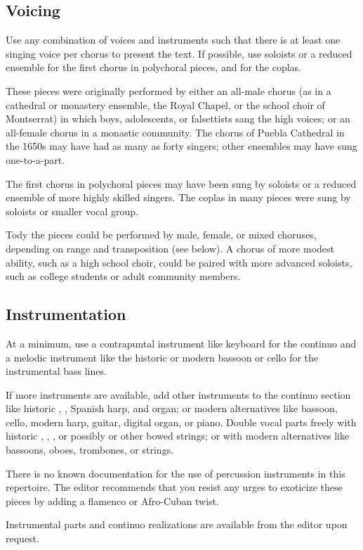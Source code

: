 \subsection*{Voicing}

\begin{epitome}
    Use any combination of voices and instruments such that there is at least
    one singing voice per chorus to present the text.
    If possible, use soloists or a reduced ensemble for the first chorus in
    polychoral pieces, and for the coplas.
\end{epitome}

These pieces were originally performed by either an all-male chorus (as in a
cathedral or monastery ensemble, the Royal Chapel, or the school choir of
Montserrat) in which boys, adolescents, or falsettists sang the high voices; or
an all-female chorus in a monastic community.
The chorus of Puebla Cathedral in the 1650s may have had as many as forty
singers; other ensembles may have sung one-to-a-part.

The first chorus in polychoral pieces may have been sung by soloists or a
reduced ensemble of more highly skilled singers.
The coplas in many pieces were sung by soloists or smaller vocal group.

Tody the pieces could be performed by male, female, or mixed choruses, depending
on range and transposition (see below).
A chorus of more modest ability, such as a high school choir, could be paired
with more advanced soloists, such as college students or adult community
members.

\subsection*{Instrumentation}

\begin{epitome}
    At a minimum, use a contrapuntal instrument like keyboard for the continuo
    and a melodic instrument like the historic  or modern
    bassoon or cello for the instrumental bass lines.

    If more instruments are available, add other instruments to the continuo
    section like historic , , Spanish harp, and organ;
    or modern alternatives like bassoon, cello, modern harp, guitar, digital
    organ, or piano.
    Double vocal parts freely with historic ,
    , , or possibly
     or other bowed strings; or with modern alternatives
    like bassoons, oboes, trombones, or strings.
   
    There is no known documentation for the use of percussion instruments in
    this repertoire.
    The editor recommends that you resist any urges to exoticize these pieces by
    adding a flamenco or Afro-Cuban twist.

    Instrumental parts and continuo realizations are available from the editor
    upon request.  
\end{epitome}
    

